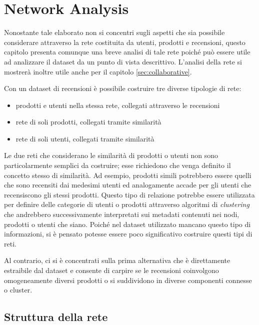 \documentclass[hidelinks, 12pt]{article}
\begin{document}
\section{Network Analysis}
\label{sec:network-anal}


Nonostante tale elaborato non si concentri sugli aspetti che sia possibile considerare attraverso la rete costituita da utenti, prodotti e recensioni, questo capitolo presenta comunque una breve analisi di tale rete poiché può essere utile ad analizzare il dataset da un punto di vista descrittivo. L'analisi della rete si mostrerà inoltre utile anche per il capitolo \ref{sec:collaborative}.

Con un dataset di recensioni è possibile costruire tre diverse tipologie di rete:

\begin{itemize}
	\item prodotti e utenti nella stessa rete, collegati attraverso le recensioni
	\item rete di soli prodotti, collegati tramite similarità
	\item rete di soli utenti, collegati tramite similarità
\end{itemize}

Le due reti che considerano le similarità di prodotti o utenti non sono particolarmente semplici da costruire; esse richiedono che venga definito il concetto stesso di similarità. Ad esempio, prodotti simili potrebbero essere quelli che sono recensiti dai medesimi utenti ed analogamente accade per gli utenti che recensiscono gli stessi prodotti. Questo tipo di relazione potrebbe essere utilizzata per definire delle categorie di utenti o prodotti attraverso algoritmi di \textit{clustering} che andrebbero successivamente interpretati sui metadati contenuti nei nodi, prodotti o utenti che siano. Poiché nel dataset utilizzato mancano questo tipo di informazioni, si è pensato potesse essere poco significativo costruire questi tipi di reti.

Al contrario, ci si è concentrati sulla prima alternativa che è direttamente estraibile dal dataset e consente di carpire se le recensioni coinvolgono omogeneamente diversi prodotti o si suddividono in diverse componenti connesse o cluster.



\subsection{Struttura della rete}
\end{document}
